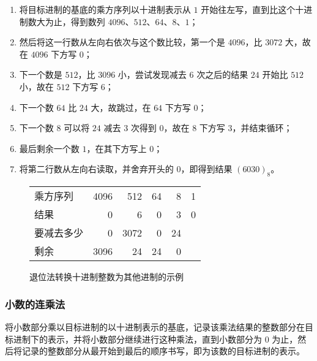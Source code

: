            \begin{enumerate}
                \item 将目标进制的基底的乘方序列以十进制表示从 $1$ 开始往左写，直到比这个十进制数大为止，得到数列 $4096$、$512$、$64$、$8$、$1$；
                \item 然后将这一行数从左向右依次与这个数比较，第一个是 $4096$，比 $3072$ 大，故在 $4096$ 下方写 $0$；
                \item 下一个数是 $512$，比 $3096$ 小，尝试发现减去 $6$ 次之后的结果 $24$ 开始比 $512$ 小，故在 $512$ 下方写 $6$；
                \item 下一个数 $64$ 比 $24$ 大，故跳过，在 $64$ 下方写 $0$；
                \item 下一个数 $8$ 可以将 $24$ 减去 $3$ 次得到 $0$，故在 $8$ 下方写 $3$，并结束循环；
                \item 最后剩余一个数 $1$，在其下方写上 $0$；
                \item 将第二行数从左向右读取，并舍弃开头的 $0$，即得到结果 $(6030)_8$。
            \end{enumerate}

            \begin{figure}
                \centering
                \begin{tabular}{lrrrrr}
                    乘方序列     & 4096 &  512 & 64 &  8 & 1 \\
                    结果         & 0    &    6 &  0 &  3 & 0 \\ \hline
                    要减去多少   & 0    & 3072 &  0 & 24 &   \\
                    剩余         & 3096 &   24 & 24 &  0 &
                \end{tabular}
                \caption{退位法转换十进制整数为其他进制的示例}
                \label{fig:ArithBasics/positional-notation-conversion/from-decimal/integer-descending-subtraction/sample}
            \end{figure}
        \subsubsection{小数的连乘法}\label{subsubsec:ArithBasics/positional-notation-conversion/from-decimal/fractal-long-multiplication}
            将小数部分乘以目标进制的以十进制表示的基底，记录该乘法结果的整数部分在目标进制下的表示，并将小数部分继续进行这种乘法，直到小数部分为 0 为止，然后将记录的整数部分从最开始到最后的顺序书写，即为该数的目标进制的表示。

